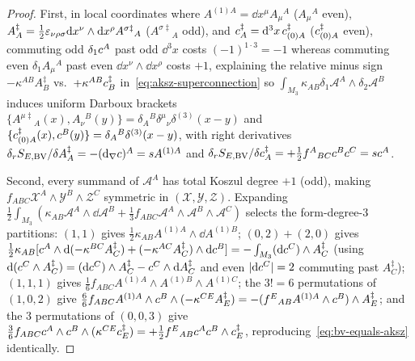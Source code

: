 \begin{proof}
First, in local coordinates where $A^{(1)A} = \dd x^\mu A_\mu{}^A$ ($A_\mu{}^A$ even), $A^\ddagger_A = \frac{1}{2}\varepsilon_{\nu\rho\sigma}\mathrm{d} x^\nu\wedge\mathrm{d} x^\rho A^{\sigma\ddagger}{}_A$ ($A^{\sigma\ddagger}{}_A$ odd), and $c^\ddagger_A = \mathrm{d}^3x\,c^\ddagger_{(0)A}$ ($c^\ddagger_{(0)A}$ even), commuting odd $\delta_1c^A$ past odd $\dd^3x$ costs $(-1)^{1\cdot 3} = -1$ whereas commuting even $\delta_1 A_\mu{}^A$ past even $\dd x^\nu\wedge\dd x^\rho$ costs $+1$, explaining the relative minus sign $-\kappa^{AB}A^\ddagger_B$ vs.\ $+\kappa^{AB}c^\ddagger_B$ in~\eqref{eq:aksz-superconnection} so $\int_{M_3}\kappa_{AB}\delta_1\mathcal{A}^A\wedge\delta_2\mathcal{A}^B$ induces uniform Darboux brackets $\{A^{\mu\ddagger}{}_A(x), A_\nu{}^B(y)\} = \delta_A{}^B\delta^\mu{}_\nu\delta^{(3)}(x-y)$ and $\{c^\ddagger_{(0)A}(x), c^B(y)\} = \delta_A{}^B\delta^{(3)}(x-y)$, with right derivatives $\delta_r S_{E,\mathrm{BV}}/\delta A^\ddagger_A = -(\mathrm{d}_\nabla c)^A = s A^{(1)A}$ and $\delta_r S_{E,\mathrm{BV}}/\delta c^\ddagger_A = +\frac{1}{2}f^A{}_{BC}c^Bc^C = sc^A$.

Second, every summand of $\mathcal{A}^A$ has total Koszul degree $+1$ (odd), making $f_{ABC}\mathcal{X}^A\wedge\mathcal{Y}^B\wedge\mathcal{Z}^C$ symmetric in $(\mathcal{X},\mathcal{Y},\mathcal{Z})$. Expanding $\frac{1}{2}\int_{M_3}(\kappa_{AB}\mathcal{A}^A\wedge\dd\mathcal{A}^B + \frac{1}{3}f_{ABC}\mathcal{A}^A\wedge\mathcal{A}^B\wedge\mathcal{A}^C)$ selects the form-degree-$3$ partitions: $(1,1)$ gives $\frac{1}{2}\kappa_{AB}A^{(1)A}\wedge\dd A^{(1)B}$; $(0,2)+(2,0)$ gives $\frac{1}{2}\kappa_{AB}[c^A\wedge\mathrm{d}(-\kappa^{BC}A^\ddagger_C) + (-\kappa^{AC}A^\ddagger_C)\wedge\mathrm{d}c^B] = -\int_{M_3}(\mathrm{d}c^C)\wedge A^\ddagger_C$ (using $\mathrm{d}(c^C\wedge A^\ddagger_C) = (\mathrm{d}c^C)\wedge A^\ddagger_C - c^C\wedge\mathrm{d} A^\ddagger_C$ and even $|\mathrm{d}c^C| = 2$ commuting past $A^\ddagger_C$); $(1,1,1)$ gives $\frac{1}{6}f_{ABC}A^{(1)A}\wedge A^{(1)B}\wedge A^{(1)C}$; the $3! = 6$ permutations of $(1,0,2)$ give $\frac{6}{6}f_{ABC}A^{(1)A}\wedge c^B\wedge(-\kappa^{CE}A^\ddagger_E) = -(f^E{}_{AB}A^{(1)A}\wedge c^B)\wedge A^\ddagger_E$; and the $3$ permutations of $(0,0,3)$ give $\frac{3}{6}f_{ABC}c^A\wedge c^B\wedge(\kappa^{CE}c^\ddagger_E) = +\frac{1}{2}f^E{}_{AB}c^Ac^B\wedge c^\ddagger_E$, reproducing~\eqref{eq:bv-equals-aksz} identically.
\end{proof}

